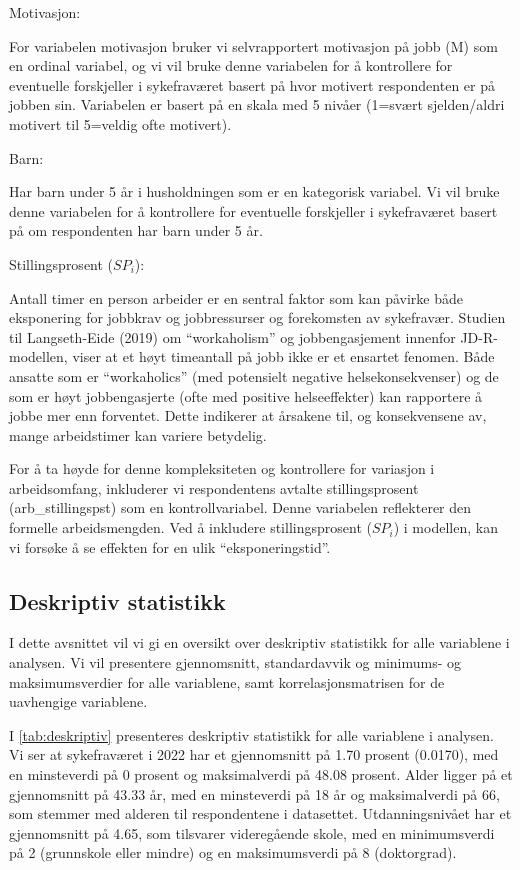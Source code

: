\documentclass[
  12pt,
  a4paper,
  DIV=11,
  numbers=noendperiod]{scrartcl}
\begin{document}
Motivasjon:

For variabelen motivasjon bruker vi selvrapportert motivasjon på jobb
(M) som en ordinal variabel, og vi vil bruke denne variabelen for å
kontrollere for eventuelle forskjeller i sykefraværet basert på hvor
motivert respondenten er på jobben sin. Variabelen er basert på en skala
med 5 nivåer (1=svært sjelden/aldri motivert til 5=veldig ofte
motivert).

Barn:

Har barn under 5 år i husholdningen som er en kategorisk variabel. Vi
vil bruke denne variabelen for å kontrollere for eventuelle forskjeller
i sykefraværet basert på om respondenten har barn under 5 år.

Stillingsprosent (\(SP_i\)):

Antall timer en person arbeider er en sentral faktor som kan påvirke
både eksponering for jobbkrav og jobbressurser og forekomsten av
sykefravær. Studien til Langseth-Eide (2019) om ``workaholism'' og
jobbengasjement innenfor JD-R-modellen, viser at et høyt timeantall på
jobb ikke er et ensartet fenomen. Både ansatte som er ``workaholics''
(med potensielt negative helsekonsekvenser) og de som er høyt
jobbengasjerte (ofte med positive helseeffekter) kan rapportere å jobbe
mer enn forventet. Dette indikerer at årsakene til, og konsekvensene av,
mange arbeidstimer kan variere betydelig.

For å ta høyde for denne kompleksiteten og kontrollere for variasjon i
arbeidsomfang, inkluderer vi respondentens avtalte stillingsprosent
(arb\_stillingspst) som en kontrollvariabel. Denne variabelen
reflekterer den formelle arbeidsmengden. Ved å inkludere
stillingsprosent (\(SP_i\)) i modellen, kan vi forsøke å se effekten for
en ulik ``eksponeringstid''.

\subsection{Deskriptiv statistikk}\label{deskriptiv-statistikk}

I dette avsnittet vil vi gi en oversikt over deskriptiv statistikk for
alle variablene i analysen. Vi vil presentere gjennomsnitt,
standardavvik og minimums- og maksimumsverdier for alle variablene, samt
korrelasjonsmatrisen for de uavhengige variablene.

I \autoref{tab:deskriptiv} presenteres deskriptiv statistikk for alle
variablene i analysen. Vi ser at sykefraværet i 2022 har et gjennomsnitt
på 1.70 prosent (0.0170), med en minsteverdi på 0 prosent og
maksimalverdi på 48.08 prosent. Alder ligger på et gjennomsnitt på 43.33
år, med en minsteverdi på 18 år og maksimalverdi på 66, som stemmer med
alderen til respondentene i datasettet. Utdanningsnivået har et
gjennomsnitt på 4.65, som tilsvarer videregående skole, med en
minimumsverdi på 2 (grunnskole eller mindre) og en maksimumsverdi på 8
(doktorgrad).
\end{document}
